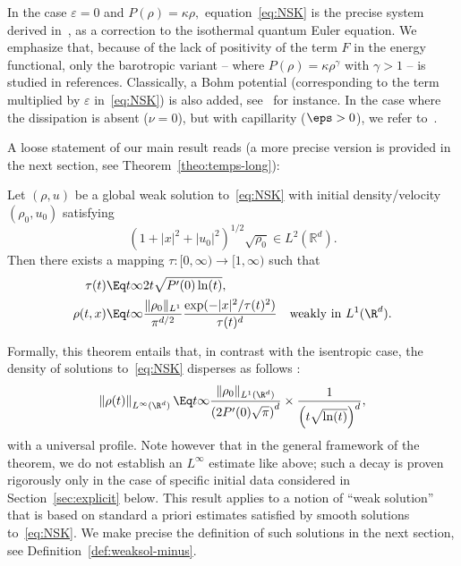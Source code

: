 In the case $\varepsilon =0$ and $P(\rho)= \kappa \rho,$ equation~\eqref{eq:NSK} is the precise system derived in~\cite{Bru-Me10}, as a correction to the isothermal quantum Euler equation. We emphasize that, because of the lack of positivity of the term $F$ in the energy functional, only the barotropic variant -- where $P(\rho) = \kappa\rho^{\gamma}$ with $\gamma >1$ -- is studied in references. Classically, a Bohm potential (corresponding to the term multiplied by $\varepsilon$ in~\eqref{eq:NSK}) is also added, see~\cite{AS-comp,Gis-VV15,Jungel,VasseurYu} for instance. In the case where the dissipation is absent ($\nu=0$), but with capillarity ($\eps>0$), we refer to~\cite{BDD07,AnMa09,AnMa12,AuHa17}.

A loose statement of our main result reads (a more precise version is provided in the next section, see Theorem~\ref{theo:temps-long}):

\begin{theo}\label{thm_mainrough}
Let $(\rho,u)$ be a global weak solution to~\eqref{eq:NSK} with initial density/velocity $(\rho_0,u_0)$ satisfying
\[
(1+|x|^2 +|u_0|^2)^{1/2} \sqrt{\rho_0}\in L^2(\mathbb R^d).
\]
Then there exists a mapping $\tau : [0,\infty) \to [1,\infty)$ such that
\begin{align*}
\tau(t) &\Eq t \infty 2t \sqrt{P'(0) \ln(t)}, \\
\rho(t, x) &\Eq t \infty \dfrac{\|\rho_0\|_{L^1}}{\pi^{d/2}}
\dfrac{\exp(-|x|^2/\tau(t)^2)}{\tau(t)^{d}}\quad
\text{weakly in }L^1(\R^d).
\end{align*}
\end{theo}

Formally, this theorem entails that, in contrast with the isentropic case, the density of solutions to~\eqref{eq:NSK} disperses as follows :
\begin{equation*}
\left\| \rho(t)\right\|_{L^\infty(\R^d)}\Eq t \infty
\frac{\|\rho_0\|_{L^1(\R^d)}}{\left(2P'(0)\sqrt{\pi}\right)^d}\times
\frac{1}{\left(t\sqrt{\ln(t)}\right)^d},
\end{equation*}
with a universal profile. Note however that in the general framework of the theorem, we do not establish an $L^\infty$ estimate like above; such a decay is proven rigorously only in the case of specific initial data considered in Section~\ref{sec:explicit} below. This result applies to a notion of ``weak solution'' that is based on standard a priori estimates satisfied by smooth solutions to~\eqref{eq:NSK}. We make precise the definition of such solutions in the next section, see Definition~\ref{def:weaksol-minus}.

